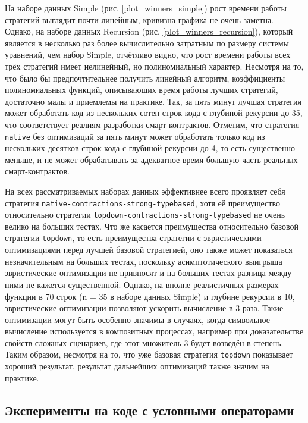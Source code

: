 \documentclass[../thesis.tex]{subfiles}
\begin{document}
На наборе данных Simple (рис. \ref{plot_winners_simple}) рост времени работы стратегий выглядит почти линейным, кривизна графика не очень заметна. Однако, на наборе данных Recursion (рис. \ref{plot_winners_recursion}), который является в несколько раз более вычислительно затратным по размеру системы уравнений, чем набор Simple, отчётливо видно, что рост времени работы всех трёх стратегий имеет нелинейный, но полиномиальный характер. Несмотря на то, что было бы предпочтительнее получить линейный алгоритм, коэффициенты полиномиальных функций, описывающих время работы лучших стратегий, достаточно малы и приемлемы на практике. Так, за пять минут лучшая стратегия может обработать код из нескольких сотен строк кода с глубиной рекурсии до 35, что соответствует реалиям разработки смарт-контрактов. Отметим, что стратегия \texttt{native} без оптимизаций за пять минут может обработать только код из нескольких десятков строк кода с глубиной рекурсии до 4, то есть существенно меньше, и не может обрабатывать за адекватное время большую часть реальных смарт-контрактов.

На всех рассматриваемых наборах данных эффективнее всего проявляет себя стратегия \texttt{native-contractions-strong-typebased}, хотя её преимущество относительно стратегии \texttt{topdown-contractions-strong-typebased} не очень велико на больших тестах. Что же касается преимущества относительно базовой стратегии \texttt{topdown}, то есть преимущества стратегии с эвристическими оптимизациями перед лучшей базовой стратегией, оно также может показаться незначительным на больших тестах, поскольку асимптотического выигрыша эвристические оптимизации не привносят и на больших тестах разница между ними не кажется существенной. Однако, на вполне реалистичных размерах функции в 70 строк (n = 35 в наборе данных Simple) и глубине рекурсии в 10, эвристические оптимизации позволяют ускорить вычисление в 3 раза. Такие оптимизации могут быть особенно значимы в случаях, когда символьное вычисление используется в композитных процессах, например при доказательстве свойств сложных сценариев, где этот множитель 3 будет возведён в степень. Таким образом, несмотря на то, что уже базовая стратегия \texttt{topdown} показывает хороший результат, результат дальнейших оптимизаций также значим на практике.

\subsection{Эксперименты на коде с условными операторами}
\end{document}
